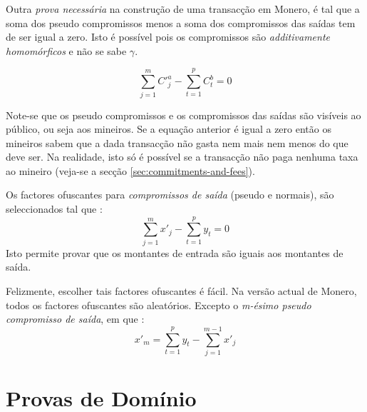 Outra {\em prova necessária} na construção de uma transacção em Monero, é tal que a soma dos pseudo compromissos menos a soma dos compromissos das saídas tem de ser igual a zero. Isto é possível pois os compromissos são {\em additivamente homomórficos} e não se sabe $\gamma$. 

\[\sum_{j=1}^{m}{C'^a_{j}} - \sum_{t=1}^{p}{C^b_{t}} = 0\]

Note-se que os pseudo compromissos e os compromissos das saídas são visíveis ao público, ou seja aos mineiros. Se a equação anterior é igual a zero então os mineiros sabem que a dada transacção não gasta nem mais nem menos do que deve ser. 
Na realidade, isto só é possível se a transacção não paga nenhuma taxa ao mineiro  (veja-se a secção \ref{sec:commitments-and-fees}).




Os factores ofuscantes para {\em compromissos de saída } (pseudo e normais), são seleccionados tal que :
\[\sum_{j=1}^{m} x'_j  - \sum_{t=1}^{p} y_t = 0\]
Isto permite provar que os montantes de entrada são iguais aos montantes de saída.



Felizmente, escolher tais factores ofuscantes é fácil. Na versão actual de Monero, todos os factores ofuscantes são aleatórios.
Excepto o {\em m-ésimo pseudo compromisso de saída}, em que :
\[x'_m = \sum_{t=1}^{p} y_t - \sum_{j=1}^{m-1} x'_j\]


\section{Provas de Domínio}
\label{sec:range_proofs}


